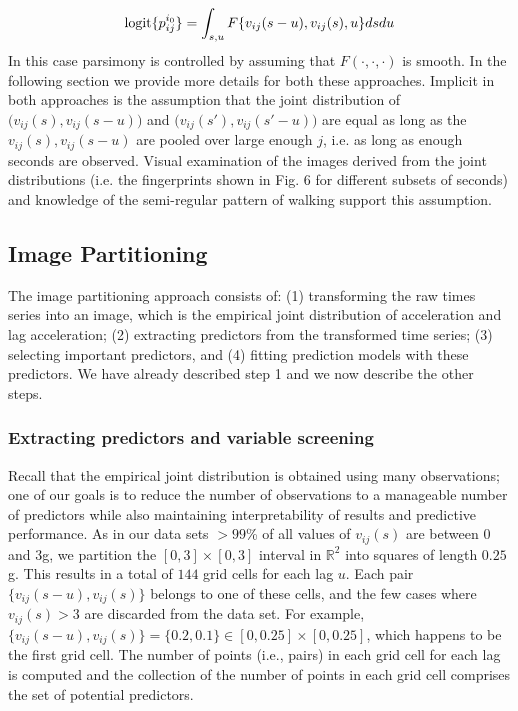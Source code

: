 \begin{equation}
{\rm logit}\{p_{ij}^{i_0}\}= \int_{s,u} F\{v_{ij}(s-u),v_{ij}(s),u\}dsdu
\label{eq:3Dfunctional}
\end{equation} 
In this case parsimony is controlled by assuming that $F(\cdot,\cdot,\cdot)$ is smooth. In the following section we provide more details for both these approaches.  Implicit in both approaches is the assumption that the joint distribution of $\big(v_{ij}(s), v_{ij}(s-u)\big)$ and $\big(v_{ij}(s'), v_{ij}(s'-u)\big)$ are equal as long as the $v_{ij}(s), v_{ij}(s-u)$ are pooled over large enough $j$, i.e. as long as enough seconds are observed. Visual examination of the images derived from the joint distributions (i.e. the fingerprints shown in Fig. 6 for different subsets of seconds) and knowledge of the semi-regular pattern of walking support this assumption. 


\subsection{Image Partitioning}\label{sec:imagepartition}
The image partitioning approach consists of: (1) transforming the raw times series into an image, which is the empirical joint distribution of acceleration and lag acceleration; (2) extracting predictors from the transformed time series; (3) selecting important predictors, and (4) fitting prediction models with these predictors. We have already described step 1 and we now describe the other steps.

\subsubsection{Extracting predictors and variable screening}\label{subsec:define_and_screen}

Recall that the empirical joint distribution is obtained using many observations; one of our goals is to reduce the number of observations to a manageable number of predictors while also maintaining interpretability of results and predictive performance. As in our data sets $>99$\% of all values of $v_{ij}(s)$ are between $0$ and $3$g, we partition the $[0,3]\times [0,3]$ interval in $\mathbb{R}^2$ into squares of length $0.25$g. This results in a total of $144$ grid cells for each lag $u$. Each pair $\{v_{ij}(s-u), v_{ij}(s)\}$ belongs to one of these cells, and the few cases where $v_{ij}(s) > 3$ are discarded from the data set. For example, $\{v_{ij}(s-u), v_{ij}(s)\} = \{0.2, 0.1\} \in [0, 0.25] \times [0, 0.25]$, which happens to be the first grid cell. The number of points (i.e., pairs) in each grid cell for each lag is computed and the collection of the number of points in each grid cell comprises the set of potential predictors. 

